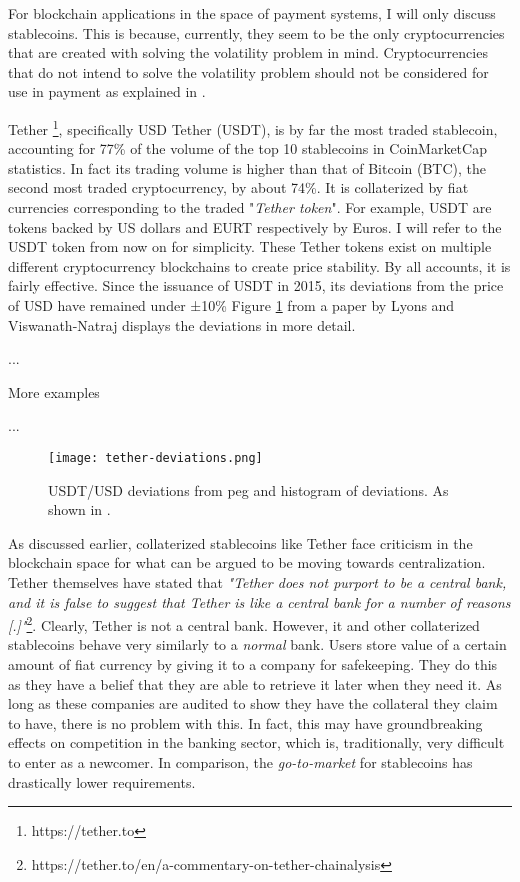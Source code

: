 For blockchain applications in the space of payment systems, I will
only discuss stablecoins. This is because, currently, they seem to be
the only cryptocurrencies that are created with solving the volatility
problem in mind. Cryptocurrencies that do not intend to solve the
volatility problem should not be considered for use in payment as
explained in \cite{yermackBitcoin}.

Tether \footnote{https://tether.to}, specifically USD Tether (USDT),
is by far the most traded stablecoin, accounting for 77\% of the
volume of the top 10 stablecoins in CoinMarketCap statistics. In fact
its trading volume is higher than that of Bitcoin (BTC), the second
most traded cryptocurrency, by about 74\%. It is collaterized by fiat
currencies corresponding to the traded "\textit{Tether token}". For
example, USDT are tokens backed by US dollars and EURT respectively by
Euros. I will refer to the USDT token from now on for simplicity.
These Tether tokens exist on multiple different cryptocurrency
blockchains to create price stability. By all accounts, it is fairly
effective. Since the issuance of USDT in 2015, its deviations from the
price of USD have remained under ±10\% Figure
\ref{fig:tether-deviations} from a paper by Lyons and Viswanath-Natraj
\cite{lyonsStable} displays the deviations in more detail.

...

More examples

...

\begin{figure}
  \texttt{[image: tether-deviations.png]}
  \caption{USDT/USD deviations from peg and histogram of deviations.
  As shown in \cite{lyonsStable}.}
  \label{fig:tether-deviations}
\end{figure}

As discussed earlier, collaterized stablecoins like Tether face
criticism in the blockchain space for what can be argued to be moving
towards centralization. Tether themselves have stated that
\textit{"Tether does not purport to be a central bank, and it is false
to suggest that Tether is like a central bank for a number of reasons
[.]"}\footnote{https://tether.to/en/a-commentary-on-tether-chainalysis}.
Clearly, Tether is not a central bank. However, it and other
collaterized stablecoins behave very similarly to a \textit{normal}
bank. Users store value of a certain amount of fiat currency by giving
it to a company for safekeeping. They do this as they have a belief
that they are able to retrieve it later when they need it. As long as
these companies are audited to show they have the collateral they
claim to have, there is no problem with this. In fact, this may have
groundbreaking effects on competition in the banking sector, which is,
traditionally, very difficult to enter as a newcomer. In comparison,
the \textit{go-to-market} for stablecoins has drastically lower
requirements.


